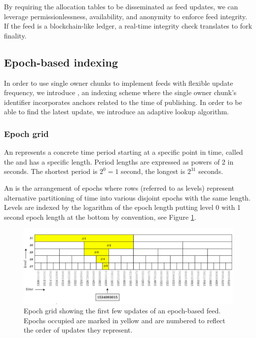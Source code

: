 By requiring the allocation tables to be disseminated as feed updates, we can leverage permissionlessness, availability, and anonymity to enforce feed integrity. If the feed is a blockchain-like ledger, a real-time integrity check translates to fork finality. 


\subsection{Epoch-based 
indexing \statusyellow}\label{sec:epoch-based-feeds}

\yellow{}

In order to use single owner chunks to implement feeds with flexible update frequency, we introduce , an indexing scheme where the single owner chunk's identifier incorporates anchors related to the time of publishing. In order to be able to find the latest update, we introduce
an adaptive lookup algorithm. 

\subsubsection{Epoch grid}

An  represents a concrete time period starting at a specific point in time, called the  and has a specific length.  
Period lengths are expressed as powers of 2 in seconds. The shortest period is $2^0 = 1$ second, the longest is $2^{31}$ seconds. 

An  is the arrangement of epochs where rows (referred to as levels) represent alternative partitioning of time into various disjoint epochs with the same length. Levels are indexed by the logarithm of the epoch length putting level 0 with 1 second epoch length at the bottom by convention, see Figure \ref{fig:epoch-grid}.

\begin{figure}[htbp]
\centering
\includegraphics[width=\textwidth]{fig/epoch-grid.pdf}
\caption[Epoch grid with epoch-based feed updates\statusorange]{Epoch grid showing the first few updates of an epoch-based feed. Epochs occupied are marked in yellow and are numbered to reflect the order of updates they represent. }
\label{fig:epoch-grid}
\end{figure}

